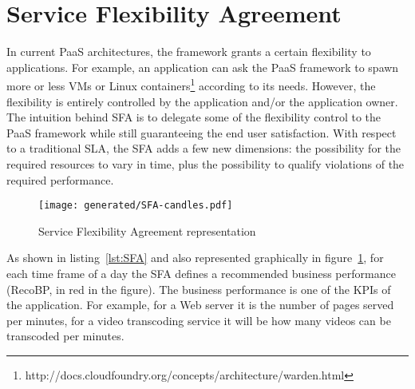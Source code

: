 \section{Service Flexibility Agreement}
\label{sec:sfa}

In current PaaS architectures, the framework grants a certain flexibility to applications.
For example, an application can ask the PaaS framework to spawn more or less VMs or Linux containers\footnote{http://docs.cloudfoundry.org/concepts/architecture/warden.html} according to its needs.
However, the flexibility is entirely controlled by the application and/or the application owner.
The intuition behind SFA is to delegate some of the flexibility control to the PaaS framework while still guaranteeing the end user satisfaction.
With respect to a traditional SLA, the SFA adds a few new dimensions: the possibility for the required resources to vary in time, plus the possibility to qualify violations of the required performance.

\begin{figure}[h]
\centering
\texttt{[image: generated/SFA-candles.pdf]}
\caption{Service Flexibility Agreement representation}
\label{fig:SFA}
\end{figure}


As shown in listing~\ref{lst:SFA} and also represented graphically in figure~\ref{fig:SFA}, for each time frame of a day the SFA defines a recommended business performance (RecoBP, in red in the figure). 
The business performance is one of the KPIs of the application.
For example, for a Web server it is the number of pages served per minutes, for a video transcoding service it will be how many videos can be transcoded per minutes.


